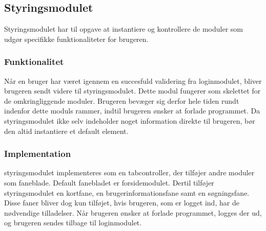 \subsection{Styringsmodulet}
\label{sub:styringsmodul}

Styringsmodulet har til opgave at instantiere og kontrollere de moduler som udgør specifikke funktionaliteter for brugeren.

\subsubsection{Funktionalitet}
\label{ssub:hovedmodul_funktionalitet}

Når en bruger har været igennem en succesfuld validering fra loginmodulet, bliver brugeren sendt videre til styringsmodulet. Dette modul fungerer som skelettet for de omkringliggende moduler. Brugeren bevæger sig derfor hele tiden rundt indenfor dette moduls rammer, indtil brugeren ønsker at forlade programmet. Da styringsmodulet ikke selv indeholder noget information direkte til brugeren, bør den altid instantiere et default element.

\subsubsection{Implementation}
\label{ssub:hovedmodul_implementation}

styringsmodulet implementeres som en tabcontroller, der tilføjer andre moduler som faneblade. Default fanebladet er forsidemodulet. Dertil tilføjer styringsmodulet en kortfane, en brugerinformationsfane samt en søgningsfane. Disse faner bliver dog kun tilføjet, hvis brugeren, som er logget ind, har de nødvendige tilladelser. Når brugeren ønsker at forlade programmet, logges der ud, og brugeren sendes tilbage til loginmodulet.
